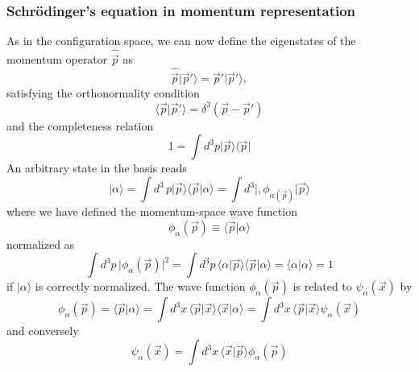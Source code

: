\subsubsection{Schrödinger's equation in momentum
representation}
As in the configuration space, we can now define the
eigenstates of the momentum operator $\hat{\vec{p}}$ as
\begin{equation}
  \hat{\vec{p}} \vert \vec{p}'\rangle  = \vec{p}' \vert \vec{p}'\rangle ,
  \label{equ:2.43}
\end{equation}
satisfying the orthonormality condition
\begin{equation}
  \langle \vec{p}\vert \vec{p}'\rangle  = \delta^3(\vec{p}-\vec{p}')
  \label{equ:2.44}
\end{equation}
and the completeness relation
\begin{equation}
  1 = \int d^3 p \vert \vec{p}\rangle \langle \vec{p}\vert 
  \label{equ:2.45}
\end{equation}
An arbitrary state in the basis reads
\begin{equation}
  \vert \alpha\rangle  = \int d^3\, p \vert \vec{p}\rangle \langle \vec{p}\vert \alpha\rangle  = \int d^3 \vert ,
  \phi_{\alpha(\vec{p})}\vert \vec{p}\rangle 
  \label{equ:2.46}
\end{equation}
where we have defined the momentum-space wave function
\begin{equation}
  \phi_{\alpha} (\vec{p}) \equiv \langle \vec{p}\vert \alpha\rangle 
  \label{equ:2.47}
\end{equation}
normalized as
\begin{equation}
  \int d^3p \, \vert \phi_{\alpha}(\vec{p})\vert ^2 = \int d^3p \,
  \langle \alpha\vert \vec{p}\rangle \langle \vec{p}\vert \alpha\rangle  = \langle \alpha\vert \alpha\rangle  = 1
  \label{equ:2.48}
\end{equation}
if $\vert \alpha\rangle $ is correctly normalized.
The wave function $\phi_{\alpha} (\vec{p})$ is related to
$\psi_{\alpha}(\vec{x})$ by
\begin{equation}
  \phi_{\alpha}(\vec{p}) = \langle \vec{p}\vert \alpha\rangle  = \int d^3x \,
  \langle \vec{p}\vert \vec{x}\rangle \langle \vec{x}\vert \alpha\rangle  = \int d^3 x\,
  \langle \vec{p}\vert \vec{x}\rangle \psi_{\alpha}(\vec{x})
  \label{equ:2.49}
\end{equation}
and conversely
\begin{equation}
  \psi_{\alpha}(\vec{x}) = \int d^3 x\, \langle \vec{x}\vert \vec{p}\rangle 
  \phi_{\alpha}(\vec{p})
  \label{equ:2.50}
\end{equation}
